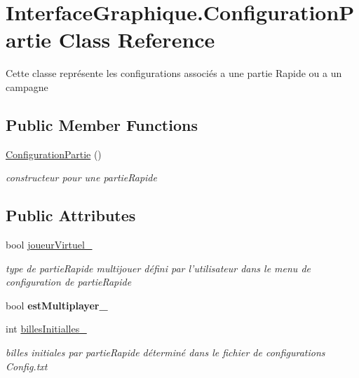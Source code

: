 \hypertarget{class_interface_graphique_1_1_configuration_partie}{\section{Interface\-Graphique.\-Configuration\-Partie Class Reference}
\label{class_interface_graphique_1_1_configuration_partie}
}


Cette classe représente les configurations associés a une partie Rapide ou a un campagne  


\subsection*{Public Member Functions}
\begin{DoxyCompactItemize}
\item 
\hyperlink{class_interface_graphique_1_1_configuration_partie_ad76acf6af1265023c8184da2825994e9}{Configuration\-Partie} ()
\begin{DoxyCompactList}\small\item\em constructeur pour une partie\-Rapide \end{DoxyCompactList}\end{DoxyCompactItemize}
\subsection*{Public Attributes}
\begin{DoxyCompactItemize}
\item 
bool \hyperlink{class_interface_graphique_1_1_configuration_partie_a166c6a679593d7f6ceb8d6ed4a7a3eff}{joueur\-Virtuel\-\_\-}
\begin{DoxyCompactList}\small\item\em type de partie\-Rapide multijouer défini par l'utilisateur dans le menu de configuration de partie\-Rapide \end{DoxyCompactList}\item 
\hypertarget{class_interface_graphique_1_1_configuration_partie_a039f0afcee48e4f3ccfe5f4211a6e6a6}{bool {\bfseries est\-Multiplayer\-\_\-}}\label{class_interface_graphique_1_1_configuration_partie_a039f0afcee48e4f3ccfe5f4211a6e6a6}

\item 
int \hyperlink{class_interface_graphique_1_1_configuration_partie_afdda795c3afe6be9b08d78fa5cc67077}{billes\-Initialles\-\_\-}
\begin{DoxyCompactList}\small\item\em billes initiales par partie\-Rapide déterminé dans le fichier de configurations Config.\-txt \end{DoxyCompactList}\end{DoxyCompactItemize}



